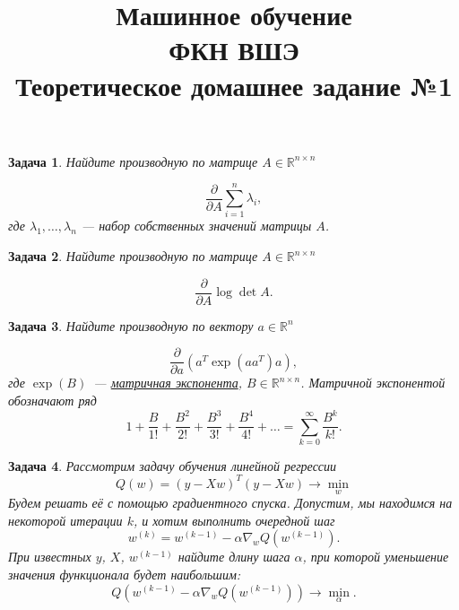 \documentclass[12pt,fleqn]{article}
\newtheorem{esProblem}{Задача}
\begin{document}
\title{Машинное обучение\\ФКН ВШЭ\\Теоретическое домашнее задание №1}

\date{}

\author{}

\maketitle


\begin{esProblem}
    Найдите производную по матрице $A \in \mathbb{R}^{n\times n}$

    \begin{equation*}
        \frac{\partial}{\partial A} \sum_{i=1}^n \lambda_i,
    \end{equation*}
    где $\lambda_1, \dots, \lambda_n$ --- набор собственных значений матрицы $A$.
\end{esProblem}

\begin{esProblem}
    Найдите производную по матрице $A \in \mathbb{R}^{n\times n}$

    \begin{equation*}
        \frac{\partial}{\partial A} \log \det A.
    \end{equation*}
\end{esProblem}

\begin{esProblem}

    Найдите производную по вектору $a \in \mathbb{R}^{n}$

    \begin{equation*}
        \frac{\partial}{\partial a} \left(
            a^T \exp(a a^T)a
        \right),
    \end{equation*}
    где $\exp(B)$~--- \href{https://en.wikipedia.org/wiki/Matrix_exponential}{матричная экспонента},
    $B \in \mathbb{R}^{n \times n}$.
    Матричной экспонентой обозначают ряд
    \begin{equation*}
        1 + \frac{B}{1!} + \frac{B^2}{2!} + \frac{B^3}{3!} + \frac{B^4}{4!} + \ldots = \sum_{k=0}^\infty \frac{B^k}{k!} .
    \end{equation*}
\end{esProblem}

\begin{esProblem}
    Рассмотрим задачу обучения линейной регрессии
    \begin{equation*}
        Q(w) = (y - Xw)^T(y - Xw) \rightarrow \min_{w}
    \end{equation*}
    Будем решать её с помощью градиентного спуска. Допустим, мы находимся на некоторой итерации $k$,
    и хотим выполнить очередной шаг
    \begin{equation*}
        w^{(k)} = w^{(k-1)} - \alpha \nabla_w Q(w^{(k - 1)}).
    \end{equation*}
    При известных $y$, $X$, $w^{(k-1)}$ найдите длину шага $\alpha$, при которой уменьшение значения функционала будет наибольшим:
    \[
        Q(w^{(k - 1)} - \alpha \nabla_w Q(w^{(k - 1)})) \to \min_{\alpha}.
    \]
\end{esProblem}
\end{document}
